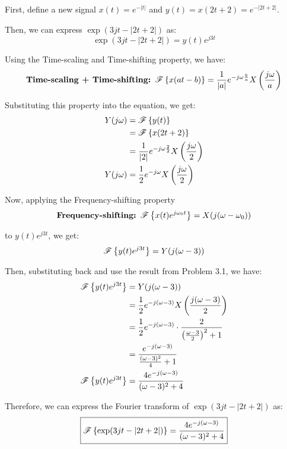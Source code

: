 \documentclass[a4paper, 10pt]{article}
\begin{document}
\begin{solution}
First, define a new signal \( x(t) = e^{-|t|} \) and \( y(t) = x(2t + 2) = e^{-|2t + 2|} \).

\par\noindent Then, we can express \( \exp(3jt - |2t + 2|) \) as:
\[
    \exp(3jt - |2t + 2|) = y(t) e^{j3t}
\]

Using the Time-scaling and Time-shifting property, we have:
\[
    \textbf{Time-scaling + Time-shifting: } \mathscr{F} \left\{ x(at - b) \right\} = \frac{1}{|a|} e^{-j\omega \frac{b}{a}} X\left( \frac{j\omega}{a} \right)
\]

Substituting this property into the equation, we get:
\begin{align*}
    Y(j\omega) &= \mathscr{F} \left\{ y(t) \right\} \\
    &= \mathscr{F} \left\{ x(2t + 2) \right\} \\
    &= \frac{1}{|2|} e^{-j\omega \frac{2}{2}} X\left( \frac{j\omega}{2} \right) \\
    Y(j\omega) &= \frac{1}{2} e^{-j\omega} X\left( \frac{j\omega}{2} \right)
\end{align*}

Now, applying the Frequency-shifting property
\[
    \textbf{Frequency-shifting: } \mathscr{F} \left\{ x(t) e^{j\omega_0 t} \right\} = X(j(\omega - \omega_0))
\]

to \( y(t) e^{j3t} \), we get:
\[ 
    \mathscr{F} \left\{ y(t) e^{j3t} \right\} = Y(j(\omega - 3))
\]

Then, substituting back and use the result from Problem 3.1, we have:
\begin{align*}  
    \mathscr{F} \left\{ y(t) e^{j3t} \right\} &= Y(j(\omega - 3)) \\
    &= \frac{1}{2} e^{-j(\omega - 3)} X\left( \frac{j(\omega - 3)}{2} \right) \\
    &= \frac{1}{2} e^{-j(\omega - 3)} \cdot \frac{2}{\left( \frac{\omega - 3}{2} \right)^2 + 1} \\
    &= \frac{e^{-j(\omega - 3)}}{\frac{(\omega - 3)^2}{4} + 1} \\
    \mathscr{F} \left\{ y(t) e^{j3t} \right\} &= \frac{4 e^{-j(\omega - 3)}}{(\omega - 3)^2 + 4}
\end{align*}

Therefore, we can express the Fourier transform of \( \exp(3jt - |2t + 2|) \) as:
\[ \boxed{
    \mathscr{F} \left\{ \exp(3jt - |2t + 2|) \right\} = \frac{4 e^{-j(\omega - 3)}}{(\omega - 3)^2 + 4}
} \]
\end{solution}

\newpage
\end{document}
